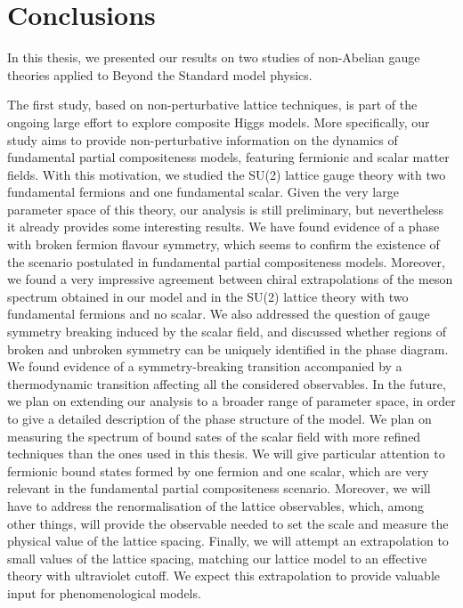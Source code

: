 \chapter{Conclusions}



In this thesis, we presented our results on two studies of non-Abelian gauge theories applied to Beyond the Standard model physics. 

The first study, based on non-perturbative lattice techniques, is part of the ongoing large effort to explore composite Higgs models. 
More specifically, our study aims to provide non-perturbative information on the dynamics of fundamental partial compositeness models, featuring fermionic and scalar matter fields.
With this motivation, we studied the SU(2) lattice gauge theory with two fundamental fermions and one fundamental scalar. Given the very large parameter space of this theory, our analysis is still preliminary, but nevertheless it already provides some interesting results. 
We have found evidence of a phase with broken fermion flavour symmetry, which seems to confirm the existence of the scenario postulated in fundamental partial compositeness models. 
Moreover, we found a very impressive agreement between chiral extrapolations of the meson spectrum obtained in our model and in the SU(2) lattice theory with two fundamental fermions and no scalar. 
We also addressed the question of gauge symmetry breaking induced by the scalar field, and discussed whether regions of broken and unbroken symmetry can be uniquely identified in the phase diagram. We found evidence of a symmetry-breaking transition accompanied by a thermodynamic transition affecting all the considered observables. In the future, we plan on extending our analysis to a broader range of parameter space, in order to give a detailed description of the phase structure of the model. We plan on measuring the spectrum of bound sates of the scalar field with more refined techniques than the ones used in this thesis. We will give particular attention to fermionic bound states formed by one fermion and one scalar, which are very relevant in the fundamental partial compositeness scenario. Moreover, we will have to address the renormalisation of the lattice observables, which, among other things, will provide the observable needed to set the scale and measure the physical value of the lattice spacing. Finally, we will attempt an extrapolation to small values of the lattice spacing, matching our lattice model to an effective theory with ultraviolet cutoff. We expect this extrapolation to provide valuable input for phenomenological models.


